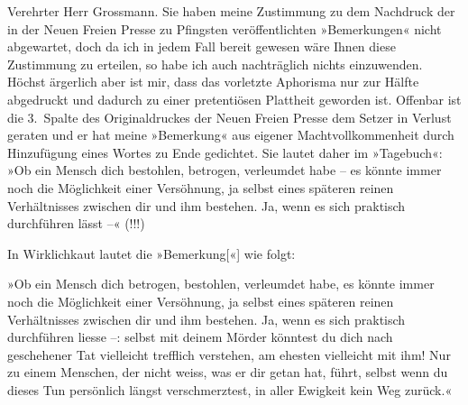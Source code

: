 \pstart{}Verehrter Herr Grossmann.\pend\vspace{0.5em}
\pstart
           Sie haben meine Zustimmung zu dem Nachdruck der in der Neuen Freien
                  Presse zu Pfingsten veröffentlichten »Bemerkungen« nicht abgewartet, doch da ich in jedem Fall
               bereit gewesen wäre Ihnen diese Zustimmung zu erteilen, so habe ich auch nachträglich
               nichts einzuwenden. Höchst ärgerlich aber ist mir, dass das vorletzte Aphorisma nur
               zur Hälfte abgedruckt und dadurch zu einer pretentiösen Plattheit geworden ist.
               Offenbar ist die 3. Spalte des Originaldruckes der Neuen Freien Presse
               dem Setzer in Verlust geraten und er hat meine »Bemerkung« aus eigener
               Machtvollkommenheit durch Hinzufügung eines Wortes zu Ende gedichtet. Sie lautet
               daher im »Tagebuch«: »Ob ein Mensch dich
               bestohlen, betrogen, verleumdet habe – es könnte immer noch die Möglichkeit einer
               Versöhnung, ja selbst eines späteren reinen Verhältnisses zwischen dir und ihm
               bestehen. Ja, wenn es sich praktisch durchführen lässt –« (!!!)\pend
           
\pstart
           In Wirklichkaut lautet die »Bemerkung{[}«{]} wie folgt:\pend
           
\pstart
           »Ob ein Mensch dich betrogen, bestohlen, 
               verleumdet habe, es könnte immer noch die Möglichkeit einer Versöhnung, ja selbst
               eines späteren reinen Verhältnisses zwischen dir und ihm bestehen. Ja, wenn es sich
               praktisch durchführen liesse –: selbst mit deinem
               Mörder könntest du dich nach geschehener Tat vielleicht trefflich verstehen, am
               ehesten vielleicht mit ihm! Nur {\pb}zu einem Menschen, der
               nicht weiss, was er dir getan hat, führt, selbst wenn du dieses Tun persönlich längst
               verschmerztest, in aller Ewigkeit kein Weg zurück.«\pend
           
